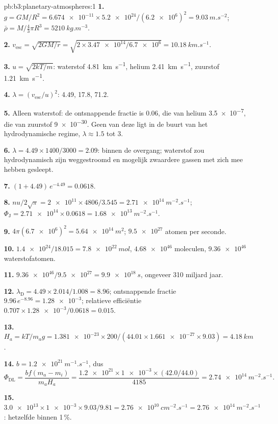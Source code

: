 \begin{solution}{pb:b3:planetary-atmospheres:1}
\textbf{1.} $g = GM/R^2 = \num{6.674e-11}\times\num{5.2e24}/(\num{6.2e6})^2 =
\qty{9.03}{m.s^{-2}}$; $\bar\rho = M/\tfrac43\pi R^3 = \qty{5210}{kg.m^{-3}}$.

\textbf{2.} $v_\mathrm{esc} = \sqrt{2GM/r} = \sqrt{2\times\num{3.47e14}/\num{6.7e6}}
= \qty{10.18}{km.s^{-1}}$.

\textbf{3.} $u = \sqrt{2kT/m}$: waterstof \qty{4.81}{km.s^{-1}}, helium
\qty{2.41}{km.s^{-1}}, zuurstof \qty{1.21}{km.s^{-1}}.

\textbf{4.} $\lambda = (v_\mathrm{esc}/u)^2$: 4.49, 17.8, 71.2.

\textbf{5.} Alleen waterstof: de ontsnappende fractie is 0.06, die van helium
\num{3.5e-7}, die van zuurstof \num{9e-30}. Geen van deze ligt in de buurt van het hydrodynamische regime,
$\lambda \approx 1.5$ tot 3.

\textbf{6.} $\lambda = 4.49\times1400/3000 = 2.09$: binnen de overgang;
waterstof zou hydrodynamisch zijn weggestroomd en mogelijk
zwaardere gassen met zich mee hebben gesleept.

\textbf{7.} $(1 + 4.49)\,e^{-4.49} = 0.0618$.

\textbf{8.} $n u/2\sqrt\pi = \num{2e11}\times4806/3.545 = \qty{2.71e14}{m^{-2}.s^{-1}}$;
$\Phi_\mathrm J = \num{2.71e14}\times0.0618 = \qty{1.68e13}{m^{-2}.s^{-1}}$.

\textbf{9.} $4\pi(\num{6.7e6})^2 = \qty{5.64e14}{m^2}$; $\num{9.5e27}$ atomen per
seconde.

\textbf{10.} $\num{1.4e24}/18.015 = \qty{7.8e22}{mol}$, $\num{4.68e46}$ moleculen,
$\num{9.36e46}$ waterstofatomen.

\textbf{11.} $\num{9.36e46}/\num{9.5e27} = \qty{9.9e18}{s}$, ongeveer 310 miljard
jaar.

\textbf{12.} $\lambda_\mathrm D = 4.49\times2.014/1.008 = 8.96$; ontsnappende fractie
$9.96\,e^{-8.96} = \num{1.28e-3}$; relatieve efficiëntie $0.707\times
\num{1.28e-3}/0.0618 = 0.015$.

\textbf{13.} $H_a = kT/m_a g = \num{1.381e-23}\times200/(44.01\times\num{1.661e-27}
\times9.03) = \qty{4.18}{km}$.

\textbf{14.} $b = \qty{1.2e21}{m^{-1}.s^{-1}}$, dus
\[
\Phi_\mathrm{DL} = \frac{b f(m_a - m_i)}{m_a H_a}
= \frac{\num{1.2e21}\times\num{1e-3}\times(42.0/44.0)}{4185}
= \qty{2.74e14}{m^{-2}.s^{-1}}.
\]

\textbf{15.} $\num{3.0e13}\times\num{1e-3}\times9.03/9.81 =
\qty{2.76e10}{cm^{-2}.s^{-1}} = \qty{2.76e14}{m^{-2}.s^{-1}}$: hetzelfde
binnen 1\,\%.


\end{solution}
